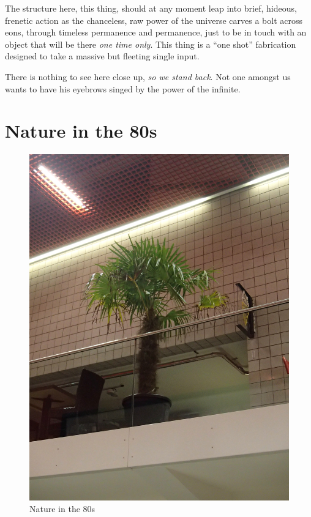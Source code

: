 \documentclass{book}
\begin{document}
The structure here, this thing, should at any moment leap into brief, hideous,
frenetic action as the chanceless, raw power of the universe carves a bolt
across eons, through timeless permanence and permanence, just to be in touch
with an object that will be there \emph{one time only}. This thing is a ``one
shot'' fabrication designed to take a massive but fleeting single input.

There is nothing to see here close up, \emph{so we stand back}. Not one amongst
us wants to have his eyebrows singed by the power of the infinite.

\chapter{Nature in the 80s}

\begin{figure}
\centering
\includegraphics[width=\textwidth,angle=-90]{figures/P1050152.JPG}
\caption{Nature in the 80s}
\end{figure}
\end{document}

